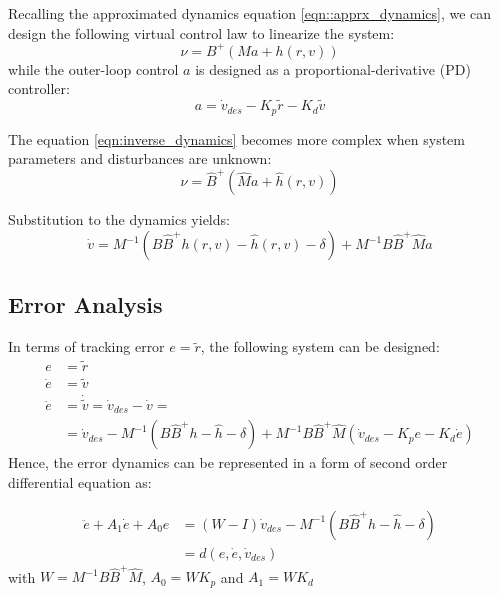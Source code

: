     Recalling the approximated dynamics equation \ref{eqn::apprx_dynamics}, we can design the following virtual control law to 
    linearize the system:
    \begin{equation}
        \label{eqn:inverse_dynamics}
        \nu = B^{+} (Ma + h(r, v))
    \end{equation}
    while the outer-loop control $a$ is designed as a proportional-derivative (PD) controller:
    \begin{equation}
        a = \dot{v}_{des} - K_p \tilde{r} - K_d \tilde{v}
    \end{equation}

    The equation \ref*{eqn:inverse_dynamics} becomes more complex when system parameters and disturbances are 
    unknown:
    \begin{equation}
    \nu = \hat{B}^{+}(\hat{M}a + \hat h(r, v))
    \end{equation}

    Substitution to the dynamics yields:
    \begin{equation}
    \dot{v} = M^{-1}(B\hat{B}^{+}h(r, v) - \hat h(r, v) - \delta) + 
    M^{-1}B\hat{B}^{+}\hat{M}a
    \end{equation}

    \subsection{Error Analysis}


    In terms of tracking error $e = \tilde{r}$, the following system can 
    be designed:
    $$
    \begin{aligned}
        e &= \tilde{r} \\
        \dot e &= \tilde{v} \\
        \ddot e &= \dot{\tilde{v}} = \dot{v}_{des} - \dot{v} = \\
        &= \dot{v}_{des} - M^{-1}(B\hat{B}^{+}h - \hat h - \delta) + 
        M^{-1}B\hat{B}^{+}\hat{M}(\dot{v}_{des} - K_pe - K_d \dot e)
    \end{aligned}
    $$
    Hence, the error dynamics can be represented in a form of second order differential 
    equation as:

    \begin{equation}
        \begin{aligned}
            \ddot e + A_1 \dot e + A_0 e  &= (W-I)\dot{v}_{des}
            - M^{-1}(B\hat{B}^{+}h - \hat h - \delta)\\
            &=d(e, \dot{e}, \dot{v}_{des})
        \end{aligned}
    \end{equation}
    with $W = M^{-1}B\hat{B}^{+}\hat{M}$, $A_0 = WK_p$ and $A_1 = WK_d$

